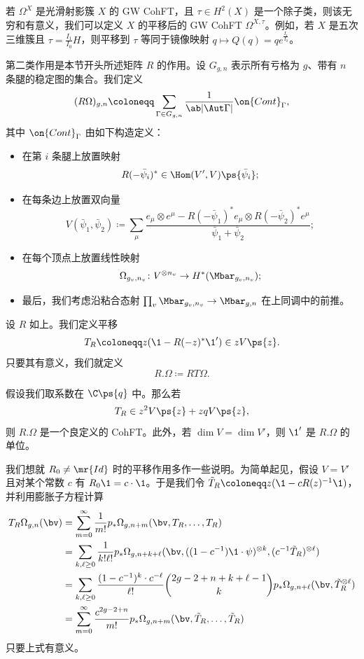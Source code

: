 \begin{exm}
    若 $\Omega^X$ 是光滑射影簇 $X$ 的 GW CohFT，且 $\tau \in H^2(X)$ 是一个除子类，则该无穷和有意义，我们可以定义 $X$ 的平移后的 GW CohFT $\Omega^{X,\tau}$。例如，若 $X$ 是五次三维簇且 $\tau = \frac{I_1}{I_0} H$，则平移到 $\tau$ 等同于镜像映射 $q \mapsto Q(q) = q e^{\frac{I_1}{I_0}}$。
\end{exm}

第二类作用是本节开头所述矩阵 $R$ 的作用。设 $G_{g,n}$ 表示所有亏格为 $g$、带有 $n$ 条腿的稳定图的集合。我们定义
\[ (R\Omega)_{g,n} \coloneqq \sum_{\Gamma \in G_{g,n}} \frac{1}{\ab|\Aut \Gamma|} \on{Cont}_{\Gamma}, \]
其中 $\on{Cont}_{\Gamma}$ 由如下构造定义：
\begin{itemize}
    \item 在第 $i$ 条腿上放置映射 
        \[ R(-\bar{\psi}_i)^* \in \Hom(V',V) \ps{\bar{\psi}_i}; \]
    \item 在每条边上放置双向量
        \[ V(\bar{\psi}_1, \bar{\psi}_2) \coloneqq \sum_{\mu} \frac{e_{\mu} \otimes e^{\mu} - R(-\bar{\psi}_1)^* e_{\mu} \otimes R(-\bar{\psi}_2)^* e^{\mu}}{\bar{\psi}_1 + \bar{\psi}_2}; \]
    \item 在每个顶点上放置线性映射
        \[ \Omega_{g_v, n_v} \colon V^{\otimes n_v} \to H^*(\Mbar_{g_v, n_v}); \]
    \item 最后，我们考虑沿粘合态射 $\prod_v \Mbar_{g_v, n_v} \to \Mbar_{g,n}$ 在上同调中的前推。
\end{itemize}

\begin{defn}
    设 $R$ 如上。我们定义平移
    \[ T_R \coloneqq z (\1 - R(-z)^* \1') \in z V\ps{z}. \]
    只要其有意义，我们就定义
    \[ R.\Omega \coloneqq RT\Omega. \]
\end{defn}

\begin{thm}
    假设我们取系数在 $\C\ps{q}$ 中。那么若
    \[ T_R \in z^2 V \ps{z} + zq V \ps{z}, \]
    则 $R.\Omega$ 是一个良定义的 CohFT。此外，若 $\dim V = \dim V'$，则 $\1'$ 是 $R.\Omega$ 的单位。
\end{thm}

我们想就 $R_0 \neq \mr{Id}$ 时的平移作用多作一些说明。为简单起见，假设 $V = V'$ 且对某个常数 $c$ 有 $R_0 \1 = c \cdot \1$。于是我们令 $\tilde{T}_R \coloneqq z( \1 - c R(z)^{-1} \1)$，并利用膨胀子方程计算
\begin{align*}
    T_R \Omega_{g,n}(\bv) &= \sum_{m=0}^{\infty} \frac{1}{m!} p_*\Omega_{g,n+m}(\bv, T_R, \ldots, T_R) \\
    &= \sum_{k,\ell \geq 0} \frac{1}{k!\ell!} p_* \Omega_{g,n+k+\ell}(\bv, ( (1-c^{-1})\1 \cdot \psi )^{\otimes k}, ( c^{-1} \tilde{T}_R )^{\otimes \ell}) \\
    &= \sum_{k,\ell \geq 0} \frac{(1-c^{-1})^k \cdot c^{-\ell}}{\ell!} \binom{2g-2+n+k+\ell-1}{k} p_* \Omega_{g,n+\ell}(\bv, \tilde{T}_R^{\otimes \ell}) \\
    &= \sum_{m=0}^{\infty} \frac{c^{2g-2+n}}{m!} p_* \Omega_{g,n+m}(\bv, \tilde{T}_R, \ldots, \tilde{T}_R)
\end{align*}
只要上式有意义。


